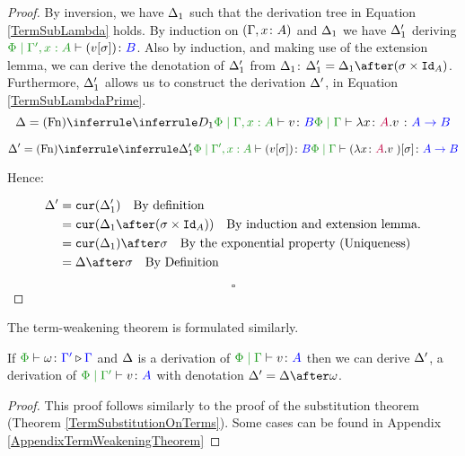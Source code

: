 \documentclass{Report}
\begin{document}
\begin{framed}
\begin{proof}
    
    \case{\vfun}
    
    By inversion, we have $\Delta_1$ such that the derivation tree in Equation \ref{TermSubLambda} holds. By induction on $(\Gamma, x\colon A)$ and $\Delta_1$ we have $\Delta_1'$ deriving $\etyperelation{\P}{\G', x:A}{(v\ssi)}{B}$. Also by induction, and making use of the extension lemma, we can derive the denotation of $\Delta_1'$  from $\Delta_1$: $\D_1' = \D_1\after(\si\times\Id{A})$. Furthermore, $\Delta_1'$ allows us to construct the derivation $\Delta'$, in Equation \ref{TermSubLambdaPrime}.
    \begin{equation}\label{TermSubLambda}
        \D = \ntreeruleI{\vfun}{
            \treeruleI{D_1}{\etyperelation{\P}{\G, x:A}{v}{B}}
        }{\etyperelation{\P}{\G}{\lam{x}{A}{v}}{\ab}}
    \end{equation}
    
    
    \begin{equation}\label{TermSubLambdaPrime}
        \D' = \ntreeruleI{\vfun}{
            \treeruleI{\D_1'}{\etyperelation{\P}{\G', x:A}{(v\ssi)}{B}}
        }{\etyperelation{\P}{\G}{(\lam{x}{A}{v})\ssi}{\ab}}
    \end{equation}
    
    
    Hence:
    
    \begin{align*}
        \D' &= \cur{\D_1'}\qt{By definition}\\
            &= \cur{\D_1\after(\si\times\Id{A})}\qt{By induction and extension lemma.}\\
            & = \cur{\D_1}\after\si\qt{By the exponential property (Uniqueness)}\\
            &= \D\after\si\qt{By Definition}\\
    \end{align*}
    
    $$\square$$
    \end{proof}
\end{framed}

The term-weakening theorem is formulated similarly. 

\begin{framed}
    \begin{theorem}\label{TermWeakeningOnTerms}
        If $\pewrel{\w}{\G'}{\G}$ and $\Delta$ is a derivation of $\gpetyperelation{v}{A}$ then we can derive $\Delta'$, a derivation of $\etyperelation{\P}{\G'}{v}{A}$ with denotation $\D' = \D\after\w$.
    \end{theorem}
    
    \begin{proof}
        This proof follows similarly to the proof of the substitution theorem (Theorem \ref{TermSubstitutionOnTerms}). Some cases can be found in Appendix \ref{AppendixTermWeakeningTheorem}
    \end{proof}
    
\end{framed}
\end{document}
